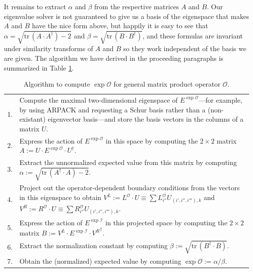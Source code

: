 \documentclass[12pt]{amsbook}
\theoremstyle{plain}
\theoremstyle{definition}
\theoremstyle{remark}
\newcommand{\tr}{\text{tr}\,}
\newcommand{\mexp}[1]{\exp{\mathcal{#1}}}
\begin{document}
It remains to extract $\alpha$ and $\beta$ from the respective matrices $A$ and $B$.  Our eigenvalue solver is not guaranteed to give us a basis of the eigenspace that makes $A$ and $B$ have the nice form above, but happily it is easy to see that $\alpha = \sqrt{\tr(A\cdot A^\dagger)-2}$ and $\beta =\sqrt{\tr(B\cdot B^\dagger)}$, and these formulas are invariant under similarity transforms of $A$ and $B$ so they work independent of the basis we are given.  The algorithm we have derived in the proceeding paragraphs is summarized in Table \ref{MPO-expectation-algorithm}.


\begin{table}
\begin{tabular}{p{0.075in}p{0.15in}p{0.1in}p{2.8in}}
1. & \multicolumn{3}{p{3.3in}}{Compute the maximal two-dimensional eigenspace of $E^{\mexp{O}}$---for example, by using ARPACK \cite{arpack} and requesting a Schur basis rather than a (non-existant) eigenvector basis---and store the basis vectors in the columns of a matrix $U$.} \\
2. & \multicolumn{3}{p{3.3in}}{Express the action of $E^{\mexp{O}}$ in this space by computing the $2\times 2$ matrix $A:=U\cdot E^{\mexp{O}}\cdot U^\dagger.$} \\
3. & \multicolumn{3}{p{3.3in}}{Extract the unnormalized expected value from this matrix by computing $\alpha:=\sqrt{\tr(A^\dagger\cdot A)-2}.$} \\
4. & \multicolumn{3}{p{3.3in}}{Project out the operator-dependent boundary conditions from the vectors in this eigenspace to obtain $V^L:=L^{\mathcal{O}}\cdot U\equiv \sum L^{\mathcal{O}}_{i''} U_{(i',i'',i'''),k}$ and $V^R:=R^{\mathcal{O}}\cdot U\equiv \sum R^{\mathcal{O}}_{i''} U_{(i',i'',i'''),k}$.} \\
5. & \multicolumn{3}{p{3.3in}}{Express the action of $E^{\mexp{I}}$ in this projected space by computing the $2\times 2$ matrix $B:={V^L} \cdot E^{\mexp{I}} \cdot {V^R}^\dagger$.} \\
6. & \multicolumn{3}{p{3.3in}}{Extract the normalization constant by computing $\beta:=\sqrt{\tr(B^\dagger\cdot B)}.$} \\
7. & \multicolumn{3}{p{3.3in}}{Obtain the (normalized) expected value by computing $\mexp{O}:=\alpha/\beta$.}
\end{tabular}
\caption{Algorithm to compute $\mexp{O}$ for general matrix product operator $\mathcal{O}$.}
\label{MPO-expectation-algorithm}
\end{table}
\end{document}
